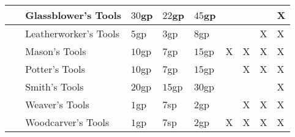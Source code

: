 \documentclass[a5paper,8pt]{book}
\begin{document}
\begin{tabularx}{\textwidth}{|p{0.1cm}lZZZYYYY|}
    ~ & Glassblower's Tools & $30$gp & $22$gp & $45$gp & ~ & ~ & ~ & X \\\hline
    ~ & Leatherworker's Tools & $5$gp & $3$gp & $8$gp & ~ & ~ & X & X \\\hline
    ~ & Mason's Tools & $10$gp & $7$gp & $15$gp & X & X & X & X \\\hline
    ~ & Potter's Tools & $10$gp & $7$gp & $15$gp & ~ & X & X & X \\\hline
    ~ & Smith's Tools & $20$gp & $15$gp & $30$gp & ~ & ~ & ~ & X \\\hline
    ~ & Weaver's Tools & $1$gp & $7$sp & $2$gp & ~ & X & X & X \\\hline
    ~ & Woodcarver's Tools & $1$gp & $7$sp & $2$gp & X & X & X & X \\\hline
    \end{tabularx}
\end{document}
